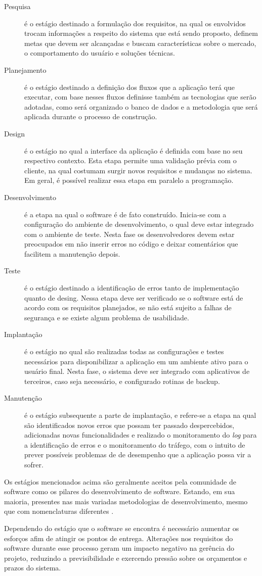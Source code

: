 \begin{description}
    \item[Pesquisa]{é o estágio destinado a formulação dos requisitos, na qual os
    envolvidos trocam informações a respeito do sistema que está sendo proposto,
    definem metas que devem ser alcançadas e buscam características sobre o mercado,
    o comportamento do usuário e soluções técnicas.}
    \item[Planejamento]{é o estágio destinado a definição dos fluxos que a aplicação
    terá que executar, com base nesses fluxos definisse também as tecnologias que
    serão adotadas, como será organizado o banco de dados e a metodologia que será
    aplicada durante o processo de construção.}
    \item[Design]{é o estágio no qual a interface da aplicação é definida com base
    no seu respectivo contexto. Esta etapa permite uma validação prévia com o cliente,
    na qual costumam surgir novos requisitos e mudanças no sistema. Em geral, é possível
    realizar essa etapa em paralelo a programação.}
    \item[Desenvolvimento]{é a etapa na qual o software é de fato construído. Inicia-se
    com a configuração do ambiente de desenvolvimento, o qual deve estar integrado com o
    ambiente de teste. Nesta fase os desenvolvedores devem estar preocupados em não
    inserir erros no código e deixar comentários que facilitem a manutenção depois.}
    \item[Teste]{é o estágio destinado a identificação de erros tanto de implementação
    quanto de desing. Nessa etapa deve ser verificado se o software está de acordo com
    os requisitos planejados, se não está sujeito a falhas de segurança e se existe
    algum problema de usabilidade.}
    \item[Implantação]{é o estágio no qual são realizadas todas as configurações e testes
    necessários para disponibilizar a aplicação em um ambiente ativo para o usuário final.
    Nesta fase, o sistema deve ser integrado com aplicativos de terceiros, caso seja
    necessário, e configurado rotinas de backup.}
    \item[Manutenção]{é o estágio subsequente a parte de implantação, e refere-se a etapa
    na qual são identificados novos erros que possam ter passado despercebidos, adicionadas
    novas funcionalidades e realizado o monitoramento do \textit{log} para a identificação
    de erros e o monitoramento do tráfego, com o intuito de prever possíveis problemas de
    de desempenho que a aplicação possa vir a sofrer.}
\end{description}

Os estágios mencionados acima são geralmente aceitos pela comunidade de software
como os pilares do desenvolvimento de software. Estando, em sua maioria, presentes
nas mais variadas metodologias de desenvolvimento, mesmo que com nomenclaturas
diferentes \cite{Despa2014}.

Dependendo do estágio que o software se encontra é
necessário aumentar os esforços afim de atingir os pontos de entrega.
Alterações
nos requisitos do software durante esse processo geram um impacto negativo na
gerência do projeto, reduzindo a previsibilidade e exercendo pressão sobre os
orçamentos e prazos do sistema.
